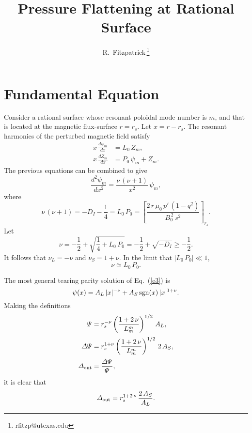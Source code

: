 \documentclass[12pt,prb,aps,notitlepage]{revtex4-1}
\begin{document}
\title{Pressure Flattening at Rational Surface}
\author{R.~Fitzpatrick\,\footnote{rfitzp@utexas.edu}}
\begin{abstract}
\end{abstract}
\maketitle

\section{Fundamental Equation}
Consider a rational surface whose  resonant poloidal mode number is $m$, and that is located at the magnetic flux-surface $r=r_s$. Let
$x=r-r_s$. The
resonant harmonics of the perturbed magnetic field satisfy
\begin{align}
x\,\frac{d\psi_{m}}{dx} &= L_0\,Z_{m},\\[0.5ex]
x\,\frac{dZ_{m}}{dx} &=P_0\,\psi_{m}+Z_{m}.
\end{align}
The previous equations can be combined to give
\begin{equation}\label{e3}
\frac{d^2\psi_{m}}{dx^2} =\frac{\nu\,(\nu+1)}{x^2}\,\psi_{m},
\end{equation}
where
\begin{equation}
\nu\,(\nu+1)= -D_I -\frac{1}{4}=L_0\,P_0= \left[\frac{2\,r\,\mu_0\,p'\,(1-q^2)}{B_0^{\,2}\,s^2}\right]_{r_s}.
\end{equation}
Let
\begin{equation}
\nu = -\frac{1}{2} + \sqrt{\frac{1}{4} + L_0\,P_0}= -\frac{1}{2}+\sqrt{-D_I}\geq -\frac{1}{2}.
\end{equation}
It follows that $\nu_L=-\nu$ and $\nu_S= 1+\nu$. In the limit that $|L_0\,P_0|\ll 1$, 
\begin{equation}
\nu\simeq L_0\,P_0.
\end{equation}

The most general tearing parity solution of Eq.~(\ref{e3}) is
\begin{equation}
\psi(x) = A_L\,|x|^{-\nu} + A_S\,{\rm sgn}(x)\,|x|^{1+\nu}.
\end{equation}
Making the definitions 
\begin{align}
{\mit\Psi} &= r_s^{-\nu}\left(\frac{1+2\,\nu}{L_m^m}\right)^{1/2}\,A_L,\\[0.5ex]
{\mit\Delta\Psi} &= r_s^{1+\nu}\left(\frac{1+2\,\nu}{L_m^m}\right)^{1/2}\,2\,A_S,\\[0.5ex]
{\mit\Delta}_{\rm out} &= \frac{\mit\Delta\Psi}{\mit\Psi},
\end{align}
it is clear that
\begin{equation}\label{e9}
{\mit\Delta}_{\rm out} = r_s^{1+2\,\nu}\,\frac{2\,A_S}{A_L}.
\end{equation}
\end{document}

